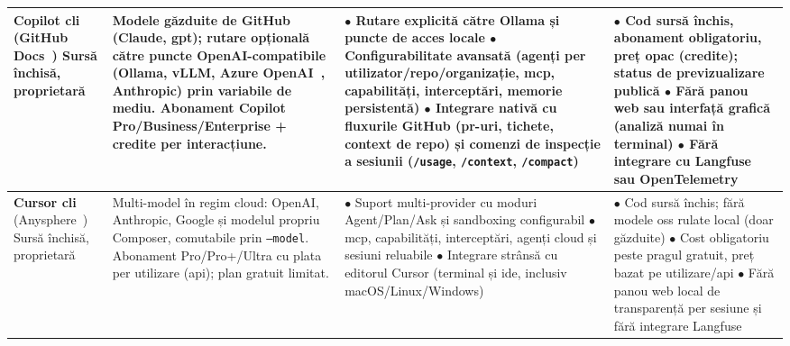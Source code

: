 \documentclass[12pt, a4paper, oneside, romanian]{teza-upb}
\begin{document}
\begin{table}[H]
\begin{tabularx}{\textwidth}{@{} >{\hsize=0.55\hsize\RaggedRight}X >{\hsize=0.95\hsize\RaggedRight}X >{\hsize=1.25\hsize\RaggedRight}X >{\hsize=1.25\hsize\RaggedRight}X @{}}
        \textbf{Copilot \ac{cli}} \newline (GitHub Docs~\cite{api_copilot_cli}) \newline Sursă închisă, proprietară &
        Modele găzduite de GitHub (Claude, \ac{gpt}); rutare opțională către puncte OpenAI-compatibile (Ollama, vLLM, Azure OpenAI~\cite{api_azure_openai}, Anthropic) prin variabile de mediu. \newline
        Abonament Copilot Pro/Business/Enterprise + credite per interacțiune. &
        $\bullet$ Rutare explicită către Ollama și puncte de acces locale\newline
        $\bullet$ Configurabilitate avansată (agenți per utilizator/repo/organizație, \ac{mcp}, capabilități, interceptări, memorie persistentă)\newline
        $\bullet$ Integrare nativă cu fluxurile GitHub (\ac{pr}-uri, tichete, context de repo) și comenzi de inspecție a sesiunii (\texttt{/usage}, \texttt{/context}, \texttt{/compact}) &
        $\bullet$ Cod sursă închis, abonament obligatoriu, preț opac (credite); status de previzualizare publică\newline
        $\bullet$ Fără panou web sau interfață grafică (analiză numai în terminal)\newline
        $\bullet$ Fără integrare cu Langfuse sau OpenTelemetry~\cite{web_opentelemetry} \\
        \midrule

        \textbf{Cursor \ac{cli}} \newline (Anysphere~\cite{web_cursor}) \newline Sursă închisă, proprietară &
        Multi-model în regim cloud: OpenAI, Anthropic, Google și modelul propriu Composer, comutabile prin \texttt{--model}. \newline
        Abonament Pro/Pro+/Ultra cu plata per utilizare (\ac{api}); plan gratuit limitat. &
        $\bullet$ Suport multi-provider cu moduri Agent/Plan/Ask și sandboxing configurabil\newline
        $\bullet$ \ac{mcp}, capabilități, interceptări, agenți cloud și sesiuni reluabile\newline
        $\bullet$ Integrare strânsă cu editorul Cursor (terminal și \ac{ide}, inclusiv macOS/Linux/Windows) &
        $\bullet$ Cod sursă închis; fără modele \ac{oss} rulate local (doar găzduite)\newline
        $\bullet$ Cost obligatoriu peste pragul gratuit, preț bazat pe utilizare/\ac{api}\newline
        $\bullet$ Fără panou web local de transparență per sesiune și fără integrare Langfuse \\
        \midrule


\end{tabularx}
\end{table}
\end{document}
